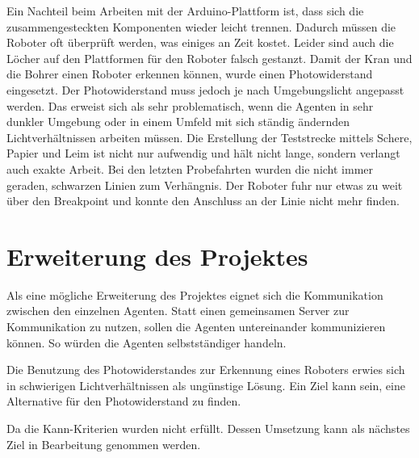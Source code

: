 Ein Nachteil beim Arbeiten mit der Arduino-Plattform ist, dass sich die zusammengesteckten Komponenten wieder leicht trennen. Dadurch müssen die Roboter oft überprüft werden, was einiges an Zeit kostet. Leider sind auch die Löcher auf den Plattformen für den Roboter falsch gestanzt. Damit der Kran und die Bohrer einen Roboter erkennen können, wurde einen Photowiderstand eingesetzt. Der Photowiderstand muss jedoch je nach Umgebungslicht angepasst werden. Das erweist sich als sehr problematisch, wenn die Agenten in sehr dunkler Umgebung oder in einem Umfeld mit sich ständig ändernden Lichtverhältnissen arbeiten müssen. Die Erstellung der Teststrecke mittels Schere, Papier und Leim ist nicht nur aufwendig und hält nicht lange, sondern verlangt auch exakte Arbeit. Bei den letzten Probefahrten wurden die nicht immer geraden, schwarzen Linien zum Verhängnis. Der Roboter fuhr nur etwas zu weit über den Breakpoint und konnte den Anschluss an der Linie nicht mehr finden.

\section{Erweiterung des Projektes}

Als eine mögliche Erweiterung des Projektes eignet sich die Kommunikation zwischen den einzelnen Agenten. Statt einen gemeinsamen Server zur Kommunikation zu nutzen, sollen die Agenten untereinander kommunizieren können. So würden die Agenten selbstständiger handeln.

Die Benutzung des Photowiderstandes zur Erkennung eines Roboters erwies sich in schwierigen Lichtverhältnissen als ungünstige Lösung. Ein Ziel kann sein, eine Alternative für den Photowiderstand zu finden.

Da die Kann-Kriterien wurden nicht erfüllt. Dessen Umsetzung kann als nächstes Ziel in Bearbeitung genommen werden.
